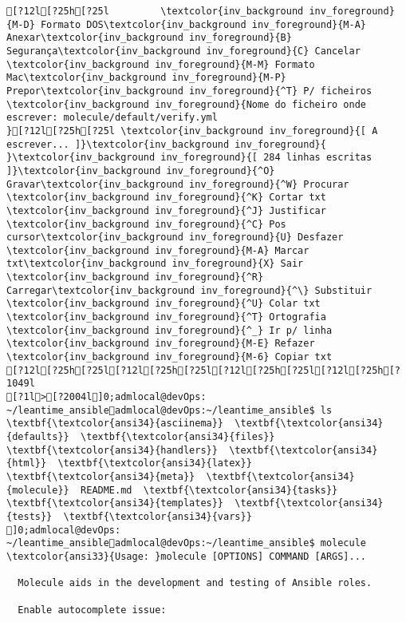 \documentclass{scrartcl}
\begin{document}
\begin{Verbatim}
[?12l[?25h[?25l         \textcolor{inv_background inv_foreground}{M-D} Formato DOS\textcolor{inv_background inv_foreground}{M-A} Anexar\textcolor{inv_background inv_foreground}{B} Segurança\textcolor{inv_background inv_foreground}{C} Cancelar           \textcolor{inv_background inv_foreground}{M-M} Formato Mac\textcolor{inv_background inv_foreground}{M-P} Prepor\textcolor{inv_background inv_foreground}{^T} P/ ficheiros
\textcolor{inv_background inv_foreground}{Nome do ficheiro onde escrever: molecule/default/verify.yml                                                                               }[?12l[?25h[?25l \textcolor{inv_background inv_foreground}{[ A escrever... ]}\textcolor{inv_background inv_foreground}{          }\textcolor{inv_background inv_foreground}{[ 284 linhas escritas ]}\textcolor{inv_background inv_foreground}{^O} Gravar\textcolor{inv_background inv_foreground}{^W} Procurar      \textcolor{inv_background inv_foreground}{^K} Cortar txt    \textcolor{inv_background inv_foreground}{^J} Justificar    \textcolor{inv_background inv_foreground}{^C} Pos cursor\textcolor{inv_background inv_foreground}{U} Desfazer     \textcolor{inv_background inv_foreground}{M-A} Marcar txt\textcolor{inv_background inv_foreground}{X} Sair    \textcolor{inv_background inv_foreground}{^R} Carregar\textcolor{inv_background inv_foreground}{^\} Substituir    \textcolor{inv_background inv_foreground}{^U} Colar txt     \textcolor{inv_background inv_foreground}{^T} Ortografia    \textcolor{inv_background inv_foreground}{^_} Ir p/ linha   \textcolor{inv_background inv_foreground}{M-E} Refazer      \textcolor{inv_background inv_foreground}{M-6} Copiar txt
[?12l[?25h[?25l[?12l[?25h[?25l[?12l[?25h[?25l[?12l[?25h[?1049l
[?1l>[?2004l]0;admlocal@devOps: ~/leantime_ansibleadmlocal@devOps:~/leantime_ansible$ ls
\textbf{\textcolor{ansi34}{asciinema}}  \textbf{\textcolor{ansi34}{defaults}}  \textbf{\textcolor{ansi34}{files}}  \textbf{\textcolor{ansi34}{handlers}}  \textbf{\textcolor{ansi34}{html}}  \textbf{\textcolor{ansi34}{latex}}  \textbf{\textcolor{ansi34}{meta}}  \textbf{\textcolor{ansi34}{molecule}}  README.md  \textbf{\textcolor{ansi34}{tasks}}  \textbf{\textcolor{ansi34}{templates}}  \textbf{\textcolor{ansi34}{tests}}  \textbf{\textcolor{ansi34}{vars}}
]0;admlocal@devOps: ~/leantime_ansibleadmlocal@devOps:~/leantime_ansible$ molecule
\textcolor{ansi33}{Usage: }molecule [OPTIONS] COMMAND [ARGS]...

  Molecule aids in the development and testing of Ansible roles.

  Enable autocomplete issue:


\end{Verbatim}
\end{document}
